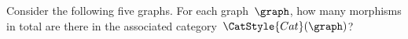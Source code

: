 \vfill\pagebreak

\begin{widepar}
    \begin{gradedexercise}
        \label{ex:HowManyMorphisms}
        Consider the following five graphs.
        For each graph~$\graph$, how many morphisms in total are there in the associated category~$\CatStyle{Cat}(\graph)$?
    \end{gradedexercise}
\end{widepar}
